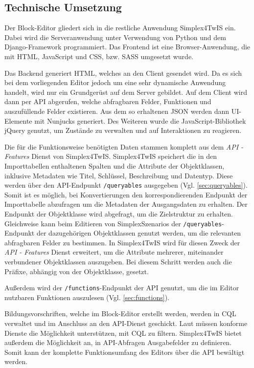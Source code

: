 \subsection{Technische Umsetzung}
Der Block-Editor gliedert sich in die restliche Anwendung Simplex4TwIS ein. Dabei wird die Serveranwendung unter Verwendung von Python und dem Django-Framework \parencite{djangosoftwarefoundationDjango} programmiert. Das Frontend ist eine Browser-Anwendung, die mit \ac{HTML}, JavaScript und \ac{CSS}, bzw. \ac{SASS} umgesetzt wurde.

Das Backend generiert \ac{HTML}, welches an den Client gesendet wird. Da es sich bei dem vorliegenden Editor jedoch um eine sehr dynamische Anwendung handelt, wird nur ein Grundgerüst auf dem Server gebildet. Auf dem Client wird dann per \ac{API} abgerufen, welche abfragbaren Felder, Funktionen und auszufüllende Felder existieren. Aus dem so erhaltenen \ac{JSON} werden dann UI-Elemente mit Nunjucks \parencite{mozillaNunjucks} generiert. Des Weiteren wurde die JavaScript-Bibliothek jQuery \parencite{openjsfoundationJQuery} genutzt, um Zustände zu verwalten und auf Interaktionen zu reagieren.

Die für die Funktionsweise benötigten Daten stammen komplett aus dem \textit{API - Features} Dienst \parencite{ogcAPI} von Simplex4TwIS. Simplex4TwIS speichert die in den Importtabellen enthaltenen Spalten und die Attribute der Objektklassen, inklusive Metadaten wie Titel, Schlüssel, Beschreibung und Datentyp. Diese werden über den \ac{API}-Endpunkt \texttt{/queryables} ausgegeben (Vgl. \ref{sec:queryables}). Somit ist es möglich, bei Konvertierungen den korrespondierenden Endpunkt der Importtabelle abzufragen um die Metadaten der Ausgangsdaten zu erhalten. Der  Endpunkt der Objektklasse wird abgefragt, um die Zielstruktur zu erhalten. Gleichweise kann beim Editieren von SimplexSzenarios der \texttt{/queryables}-Endpunkt der dazugehörigen Objektklassen genutzt werden, um die relevanten abfragbaren Felder zu bestimmen. In Simplex4TwIS wird für diesen Zweck der \textit{API - Features} Dienst erweitert, um die Attribute mehrerer, miteinander verbundener Objektklassen auszugeben. Bei diesem Schritt werden auch die Präfixe, abhängig von der Objektklasse, gesetzt.

Außerdem wird der \texttt{/functions}-Endpunkt der \ac{API} genutzt, um die im Editor nutzbaren Funktionen auszulesen (Vgl. \ref{sec:functions}).

Bildungsvorschriften, welche im Block-Editor erstellt werden, werden in \ac{CQL} verwaltet und im Anschluss an den \ac{API}-Dienst geschickt. Laut  müssen konforme Dienste die Möglichkeit unterstützen, mit \ac{CQL} zu filtern. Simplex4TwIS bietet außerdem die Möglichkeit an, in \ac{API}-Abfragen Ausgabefelder zu definieren. Somit kann der komplette Funktionsumfang des Editors über die \ac{API} bewältigt werden.
